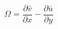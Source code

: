 \begin{equation}
    \Omega = \frac{\partial \bar{v}}{\partial x} - \frac{\partial \bar{u}}{\partial y}
    \label{EQN:IntegratedDiagnostic}
\end{equation}

